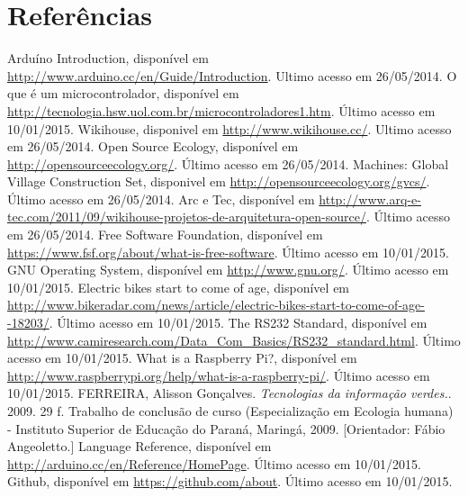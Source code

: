 \documentclass[final,12pt, times, 5p, twocolumn]{elsarticle}
\begin{document}

%

\section{Referências}
\begin{thebibliography}{00}

  Arduíno Introduction, disponível em \url{http://www.arduino.cc/en/Guide/Introduction}. Ultimo acesso em 26/05/2014.
  O que é um microcontrolador, disponível em \url{http://tecnologia.hsw.uol.com.br/microcontroladores1.htm}. Último acesso em 10/01/2015.
  Wikihouse, disponivel em \url{http://www.wikihouse.cc/}. Ultimo acesso em 26/05/2014.
   Open Source Ecology, disponível em \url{http://opensourceecology.org/}. Último acesso em 26/05/2014.
   Machines: Global Village Construction Set, disponivel em \url{http://opensourceecology.org/gvcs/}. Último acesso em 26/05/2014.
   Arc e Tec, disponível em \url{http://www.arq-e-tec.com/2011/09/wikihouse-projetos-de-arquitetura-open-source/}. Último acesso em 26/05/2014.
   Free Software Foundation, disponível em \url{https://www.fsf.org/about/what-is-free-software}. Último acesso em 10/01/2015.
   GNU Operating System, disponível em \url{http://www.gnu.org/}. Último acesso em 10/01/2015.
   Electric bikes start to come of age, disponível em \url{http://www.bikeradar.com/news/article/electric-bikes-start-to-come-of-age--18203/}. Último acesso em 10/01/2015.
   The RS232 Standard, disponível em \url{http://www.camiresearch.com/Data_Com_Basics/RS232_standard.html}. Último acesso em 10/01/2015.
   What is a Raspberry Pi?, disponível em \url{http://www.raspberrypi.org/help/what-is-a-raspberry-pi/}.
   Último acesso em 10/01/2015.
   FERREIRA, Alisson Gonçalves. \emph{Tecnologias da informação verdes.}. 2009. 29 f. Trabalho de conclusão de curso (Especialização em Ecologia humana) - Instituto Superior de Educação do Paraná, Maringá, 2009. [Orientador: Fábio Angeoletto.]
   Language Reference, disponível em \url{http://arduino.cc/en/Reference/HomePage}. Último acesso em 10/01/2015.
   Github, disponível em \url{https://github.com/about}.
   Último acesso em 10/01/2015.

\end{thebibliography}
\end{document}
